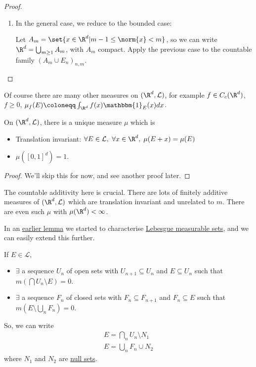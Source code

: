 \documentclass{article}
\newcommand{\1}[1]{\mathbbm{1}_{#1}}
\begin{document}
\begin{proof}
\begin{enumerate}[label=(\roman*)]
        \item In the general case, we reduce to the bounded case:

            Let $A_m = \set{x \in \R^d | m - 1 \leq \norm{x} < m}$, so we can write
            $\R^d = \bigcup_{m \geq 1} A_m$, with $A_m$ compact. Apply the previous case to the countable family $(A_m \cup E_n)_{n, m}$.\qedhere
    \end{enumerate}
\end{proof}

\begin{remark}
    Of course there are many other measures on $(\R^d, \mathcal{L})$, for example $f \in C_c(\R^d)$, $f \geq 0$, $\mu_f(E) \coloneqq \int_{\R^d} f(x) \1{E}(x) dx$.
\end{remark}

\begin{prop}
    On $(\R^d, \mathcal{L})$, there is a unique measure $\mu$ which is
    \begin{itemize}
        \item Translation invariant: $\forall E \in \mathcal{L}, \ \forall x \in \R^d, \; \mu(E + x) = \mu(E)$
        \item $\mu([0, 1]^d) = 1$.
    \end{itemize}
\end{prop}

\begin{proof}
    We'll skip this for now, and see another proof later.
\end{proof}

\begin{remark}
    The countable additivity here is crucial. There are lots of finitely additive measures of $(\R^d, \mathcal{L})$ which are translation invariant and unrelated to $m$.  There are even such $\mu$ with $\mu(\R^d) < \infty$.
\end{remark}

In an \hyperlink{lem:lebChar}{earlier lemma} we started to characterise \hyperlink{def:lebMAble}{Lebesgue measurable sets}, and we can easily extend this further.

\begin{lemma}
    If $E \in \mathcal{L}$,
    \begin{itemize}
        \item $\exists$ a sequence $U_n$ of open sets with $U_{n+1} \subseteq U_n$ and $E \subseteq U_n$ such that $m(\bigcap U_n \setminus E) = 0$.
        \item $\exists$ a sequence $F_n$ of closed sets with $F_n \subseteq F_{n+1}$ and $F_n \subseteq E$ such that $m(E \setminus \bigcup_n F_n) = 0$.
    \end{itemize}
    So, we can write
    \begin{align*}
        E = \bigcap_n U_n \setminus N_1 \\
        E = \bigcup_n F_n \cup N_2
    \end{align*}
    where $N_1$ and $N_2$ are \hyperlink{def:null}{null sets}.
\end{lemma}
\end{document}
